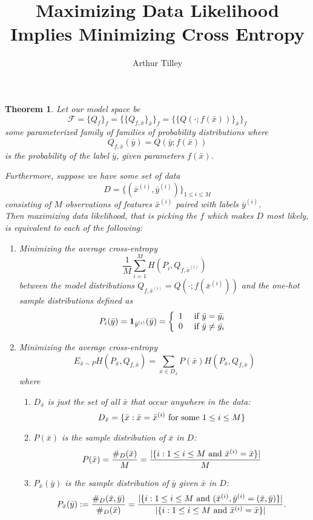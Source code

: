 \documentclass{article}
\title{Maximizing Data Likelihood Implies Minimizing Cross Entropy}
\date{}
\author{Arthur Tilley}
\newtheorem{theorem}{Theorem}
\begin{document}
\maketitle


\begin{theorem}

Let our model space be $$\mathscr{F} = \{Q_{f}\}_{f} =  \{\{Q_{f, \bar{x}}\}_{\bar{x}}\}_{f}  =  \{\{Q(\cdot ; f(\bar{x}))\}_{\bar{x}}\}_{f}$$  
 some parameterized family of families of probability distributions where 
$$Q_{f, \bar{x}}(\bar{y}) = Q(\bar{y} ; f(\bar{x}))$$ is the probability of the label $\bar{y}$, given parameters $f(\bar{x})$.  

Furthermore, suppose we have some set of data $$D = \{(\bar{x}^{(i)}, \bar{y}^{(i)})\}_{1\leq i \leq M}$$ consisting of $M$ observations of \emph{features} $\bar{x}^{(i)}$ paired with \emph{labels} $\bar{y}^{(i)}$.\\

Then maximizing data likelihood, that is picking the $f$ which makes $D$ most likely, is equivalent to each of the following: 
\begin{enumerate}
\item Minimizing the average cross-entropy 
$$\frac{1}{M}\sum_{i = 1}^{M}H(P_{i}, Q_{f, \bar{x}^{(i)}})$$ between the model distributions $Q_{f, \bar{x}^{(i)}} = Q(\cdot; f(\bar{x}^{(i)}))$ and the one-hot sample distributions defined as
$$P_{i}(\bar{y})= \mathbf{1}_{\bar{y}^{(i)}}(\bar{y}) = 
\left\{ \begin{array}{ccc} 
1 & \hbox{ if } \bar{y} = \bar{y_{i}} \\ 
0 & \hbox{ if } \bar{y} \neq \bar{y_{i}}
\end{array} \right.$$
 
\item Minimizing the average cross-entropy 
$$E_{\bar{x} \sim P} H(P_{\bar{x}}, Q_{f, \bar{x}}) = \sum_{\bar{x} \in D_{\bar{x}}} P(\bar{x}) H(P_{\bar{x}}, Q_{f, \bar{x}}) $$  where \\
\begin{enumerate}
\item $D_{\bar{x}}$  is just the set of all $\bar{x}$ that occur anywhere in the data: 
$$D_{\bar{x}} = \{\bar{x} : \bar{x} = \bar{x}^{(i)} \hbox{ for some } 1\leq i \leq M\}$$ 
\item $P(\bar{x})$ is the sample distribution of $\bar{x}$ in $D$:
$$P(\bar{x}) = \frac{\#_{D}(\bar{x})}{M} =  \frac{\lvert \{ i: 1\leq i \leq M \hbox{ and } \bar{x}^{(i)} = \bar{x}\} \rvert}{M}$$
\item $P_{\bar{x}}(\bar{y})$ is the sample distribution of $\bar{y}$ \emph{given} $\bar{x}$ in $D$:
 $$P_{\bar{x}}(\bar{y}) := \frac{\#_{D}(\bar{x}, \bar{y})}{\#_{D}(\bar{x})} = \frac{\lvert \{ i: 1\leq i \leq M \hbox{ and } (\bar{x}^{(i)}, \bar{y}^{(i)} = (\bar{x}, \bar{y}) \} \rvert}{\lvert \{ i: 1\leq i \leq M \hbox{ and } \bar{x}^{(i)} = \bar{x}\} \rvert}.$$
 \end{enumerate}
 \end{enumerate}
 

\end{theorem}
\end{document}

